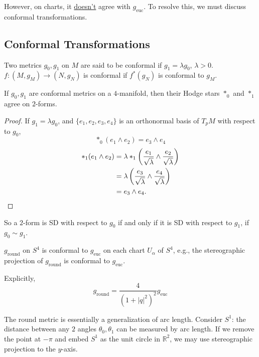 \documentclass[main]{subfiles}
\begin{document}
However, on charts, it \underline{doesn't} agree with $g_{\mathrm{euc}}$. To resolve this, we must discuss conformal transformations.

\subsection*{Conformal Transformations}

\begin{definition}
Two metrics $g_0,g_1$ on $M$ are said to be conformal if $g_1=\lambda g_0$, $\lambda>0$. $f:(M,g_M)\to(N,g_N)$ is conformal if $f^\ast(g_N)$ is conformal to $g_M$.
\end{definition}

\begin{lemma}
If $g_0,g_1$ are conformal metrics on a $4$-manifold, then their Hodge stars $\ast_0$ and $\ast_1$ agree on $2$-forms.
\end{lemma}

\begin{proof}
If $g_1=\lambda g_0$, and $\{e_1,e_2,e_3,e_4\}$ is an orthonormal basis of $T_pM$ with respect to $g_0$,
\[
\ast_0(e_1\wedge e_2)=e_3\wedge e_4
\]
\begin{align*}
\ast_1(e_1\wedge e_2) &= \lambda\ast_1\left(\frac{e_1}{\sqrt{\lambda}}\wedge\frac{e_2}{\sqrt{\lambda}}\right)\\
&= \lambda\left(\frac{e_3}{\sqrt{\lambda}}\wedge\frac{e_4}{\sqrt{\lambda}}\right)\\
&= e_3\wedge e_4. \qedhere
\end{align*}
\end{proof}

So a $2$-form is SD with respect to $g_0$ if and only if it is SD with respect to $g_1$, if $g_0\sim g_1$.

\begin{fact}
$g_{\mathrm{round}}$ on $S^4$ is conformal to $g_{\mathrm{euc}}$ on each chart $U_\alpha$ of $S^4$, e.g., the stereographic projection of $g_{\mathrm{round}}$ is conformal to $g_{\mathrm{euc}}$.
\end{fact}

Explicitly,
\[
g_{\mathrm{round}} = \frac{4}{(1+|q|^2)^2}g_{\mathrm{euc}}
\]

\begin{note}
The round metric is essentially a generalization of arc length. Consider $S^1$: the distance between any $2$ angles $\theta_0,\theta_1$ can be measured by arc length. If we remove the point at $-\pi$ and embed $S^1$ as the unit circle in $\mathbb{R}^2$, we may use stereographic projection to the $y$-axis.
\end{note}
\end{document}
